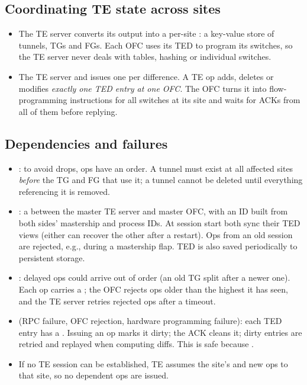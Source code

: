 \subsection{Coordinating TE state across sites}
\begin{itemize}
\item The TE server converts its output into a per-site : a key-value store of tunnels, TGs and FGs. Each OFC uses its TED to program its switches, so the TE server never deals with tables, hashing or individual switches.
\item The TE server  and issues one  per difference. A TE op adds, deletes or modifies \emph{exactly one TED entry at one OFC}. The OFC turns it into flow-programming instructions for all switches at its site and waits for ACKs from all of them before replying.
\end{itemize}

\subsection{Dependencies and failures}
\begin{itemize}
\item {}: to avoid drops, ops have an order. A tunnel must exist at all affected sites \emph{before} the TG and FG that use it; a tunnel cannot be deleted until everything referencing it is removed.
\item {}: a  between the master TE server and master OFC, with an ID built from both sides' mastership and process IDs. At session start both sync their TED views (either can recover the other after a restart). Ops from an old session are rejected, e.g., during a mastership flap. TED is also saved periodically to persistent storage.
\item {}: delayed ops could arrive out of order (an old TG split after a newer one). Each op carries a ; the OFC rejects ops older than the highest it has seen, and the TE server retries rejected ops after a timeout.
\item {} (RPC failure, OFC rejection, hardware programming failure): each TED entry has a . Issuing an op marks it dirty; the ACK cleans it; dirty entries are retried and replayed when computing diffs. This is safe because .
\item If no TE session can be established, TE assumes the site's  and  new ops to that site, so no dependent ops are issued.
\end{itemize}

